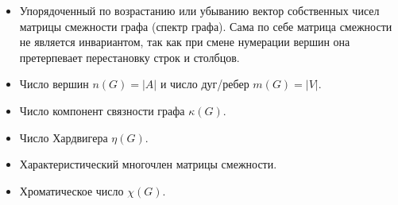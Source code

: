 \begin{itemize}
\item Упорядоченный по возрастанию или убыванию вектор собственных чисел матрицы смежности графа (спектр графа). Сама по себе матрица смежности не является инвариантом, так как при смене нумерации вершин она претерпевает перестановку строк и столбцов.
\item Число вершин  $n(G)=|A|$ и число дуг/ребер  $m(G)=|V|$.
\item Число компонент связности графа  $\kappa (G)$.
\item Число Хардвигера  $\eta (G)$.
\item Характеристический многочлен матрицы смежности.
\item Хроматическое число  $\chi (G)$.
\end{itemize}
